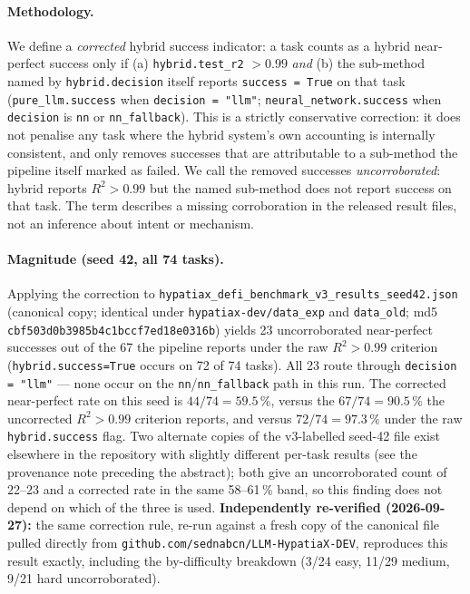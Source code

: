 \documentclass[twoside,11pt]{article}
\newcommand{\Rsq}{R^{2}}
\begin{document}
\paragraph{Methodology.} We define a \emph{corrected} hybrid success indicator:
a task counts as a hybrid near-perfect success only if (a)
\texttt{hybrid.test\_r2} $> 0.99$ \emph{and} (b) the sub-method named by
\texttt{hybrid.decision} itself reports \texttt{success = True} on that task
(\texttt{pure\_llm.success} when \texttt{decision = "llm"};
\texttt{neural\_network.success} when \texttt{decision} is \texttt{nn} or
\texttt{nn\_fallback}). This is a strictly conservative correction: it does
not penalise any task where the hybrid system's own accounting is internally
consistent, and only removes successes that are attributable to a sub-method
the pipeline itself marked as failed.
We call the removed successes \emph{uncorroborated}: hybrid reports $\Rsq>0.99$ but the named sub-method does not report success on that task. The term describes a missing corroboration in the released result files, not an inference about intent or mechanism.

\paragraph{Magnitude (seed 42, all 74 tasks).}
Applying the correction to
\texttt{hypatiax\_defi\_benchmark\_v3\_results\_seed42.json}
(canonical copy; identical under \texttt{hypatiax-dev/data\_exp} and \texttt{data\_old}; md5 \texttt{cbf503d0b3985b4c1bccf7ed18e0316b}) yields
23 uncorroborated near-perfect successes out of the 67 the pipeline reports
under the raw $\Rsq>0.99$ criterion (\texttt{hybrid.success=True} occurs
on 72 of 74 tasks). All 23 route through
\texttt{decision = "llm"} --- none occur on the
\texttt{nn}/\texttt{nn\_fallback} path in this run. The corrected
near-perfect rate on this seed is $44/74 = 59.5\,\%$, versus the
$67/74 = 90.5\,\%$ the uncorrected $\Rsq>0.99$ criterion reports, and
versus $72/74=97.3\,\%$ under the raw \texttt{hybrid.success} flag. Two
alternate copies of the v3-labelled seed-42 file exist elsewhere in the
repository with slightly different per-task results (see the provenance
note preceding the abstract); both give an uncorroborated count of 22--23 and
a corrected rate in the same 58--61\,\% band, so this finding does not
depend on which of the three is used. \textbf{Independently re-verified
(2026-09-27):} the same correction rule, re-run against a fresh copy of
the canonical file pulled directly from
\texttt{github.com/sednabcn/LLM-HypatiaX-DEV}, reproduces this result
exactly, including the by-difficulty breakdown (3/24 easy, 11/29 medium,
9/21 hard uncorroborated).
\end{document}
